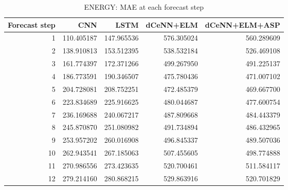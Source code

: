 \begin{table}
\caption{ENERGY: MAE at each forecast step}
\begin{tabular}{rrrrr}
\toprule
Forecast step & CNN & LSTM & dCeNN+ELM & dCeNN+ELM+ASP \\
\midrule
1 & 110.405187 & 147.965536 & 576.305024 & 560.289609 \\
2 & 138.910813 & 153.512395 & 538.532184 & 526.469108 \\
3 & 161.774397 & 172.371266 & 499.267950 & 491.225137 \\
4 & 186.773591 & 190.346507 & 475.780436 & 471.007102 \\
5 & 204.728081 & 208.752251 & 472.485379 & 469.667700 \\
6 & 223.834689 & 225.916625 & 480.044687 & 477.600754 \\
7 & 236.169688 & 240.067217 & 487.809668 & 484.443379 \\
8 & 245.870870 & 251.080982 & 491.734894 & 486.432965 \\
9 & 253.957202 & 260.016908 & 496.845337 & 489.507036 \\
10 & 262.943541 & 267.185063 & 507.455605 & 498.774888 \\
11 & 270.986556 & 273.423635 & 520.700461 & 511.584117 \\
12 & 279.214160 & 280.868215 & 529.863916 & 520.701829 \\
\bottomrule
\end{tabular}
\end{table}
